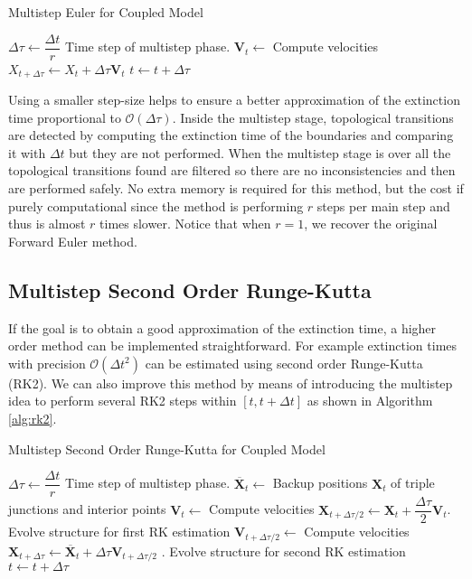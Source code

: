 \begin{algorithm}
\caption{Multistep Euler for Coupled Model}
\label{alg:multistep}
\begin{algorithmic}[1]
\State $\Delta \tau \gets \dfrac{\Delta t}{r}$ Time step of multistep phase.
\State $\mathbf{V}_t \gets$ Compute velocities
\State $X_{t + \Delta \tau} \gets X_{t} + \Delta \tau \mathbf{V}_t$
\State $t \gets t + \Delta \tau$
\EndFor
\EndProcedure
\end{algorithmic}
\end{algorithm}

Using a smaller step-size helps to ensure a better approximation of the extinction time proportional to $\mathcal{O}(\Delta \tau)$.
Inside the multistep stage, topological transitions are detected by computing the extinction time of the boundaries and comparing it with $\Delta t$ but they are not performed. When the multistep stage is over all the topological transitions found are filtered so there are no inconsistencies and then are performed safely. No extra memory is required for this method, but the cost if purely computational since the method is performing $r$ steps per main step and thus is almost $r$ times slower.  Notice that when $r = 1$, we recover the original Forward Euler method.

\subsection{Multistep Second Order Runge-Kutta}

If the goal is to obtain a good approximation of the extinction time, a higher order method can be implemented straightforward. For example extinction times with precision $\mathcal{O}(\Delta t^2)$ can be estimated using second order Runge-Kutta (RK2). We can also improve this method by means of introducing the multistep idea to perform several RK2 steps within $[t,t+\Delta t]$ as shown in Algorithm \ref{alg:rk2}.

\begin{algorithm}
\caption{Multistep Second Order Runge-Kutta for Coupled Model}
\label{alg:rk2}
\begin{algorithmic}[1]
\State $\Delta \tau \gets \dfrac{\Delta t}{r}$ Time step of multistep phase.
\State $\mathbf{\overline{X}}_t \gets$ Backup positions $\mathbf{X}_t$ of triple junctions and interior points
\State $\mathbf{V}_t \gets$ Compute velocities
\State $\mathbf{X}_{t + \Delta \tau / 2} \gets \mathbf{X}_t + \dfrac{\Delta \tau}{2} \mathbf{V}_t$. Evolve structure for first RK estimation
\State $\mathbf{V}_{t + \Delta \tau /2} \gets$ Compute velocities
\State $\mathbf{X}_{t + \Delta \tau} \gets \mathbf{\overline{X}}_t + \Delta \tau \mathbf{V}_{t + \Delta \tau /2}$ . Evolve structure for second RK estimation
\State $t \gets t + \Delta \tau$
\EndFor
\EndProcedure
\end{algorithmic}
\end{algorithm}

